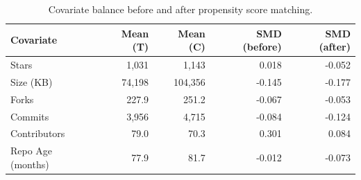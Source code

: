 \begin{table}[t]
\caption{Covariate balance before and after propensity score matching.}
\label{tab:balance}
\centering\small
\begin{tabular}{lrrrr}
\toprule
Covariate & Mean (T) & Mean (C) & SMD (before) & SMD (after) \\
\midrule
Stars & 1,031 & 1,143 & 0.018 & -0.052 \\
Size (KB) & 74,198 & 104,356 & -0.145 & -0.177 \\
Forks & 227.9 & 251.2 & -0.067 & -0.053 \\
Commits & 3,956 & 4,715 & -0.084 & -0.124 \\
Contributors & 79.0 & 70.3 & 0.301 & 0.084 \\
Repo Age (months) & 77.9 & 81.7 & -0.012 & -0.073 \\
\bottomrule
\end{tabular}
\end{table}
